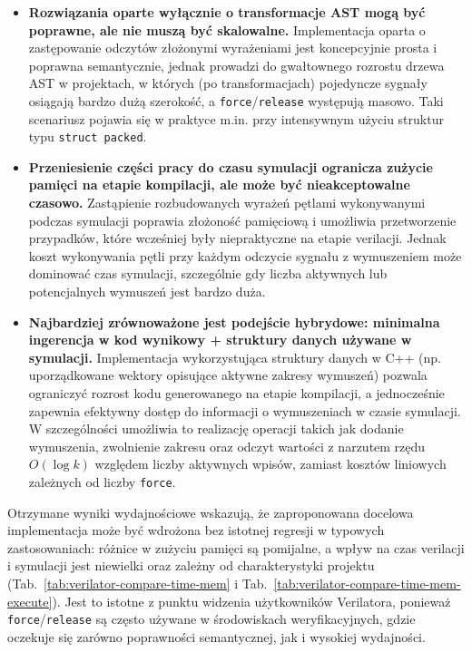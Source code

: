\documentclass[shortabstract, inz]{iithesis}
\newcounter{kod}[chapter]
\begin{document}
\begin{itemize}
    \item \textbf{Rozwiązania oparte wyłącznie o transformacje AST mogą być poprawne, ale nie muszą być skalowalne.}
    Implementacja oparta o zastępowanie odczytów złożonymi wyrażeniami jest koncepcyjnie prosta i poprawna semantycznie, jednak prowadzi do gwałtownego rozrostu drzewa AST w projektach, w których (po transformacjach) pojedyncze sygnały osiągają bardzo dużą szerokość, a \texttt{force}/\texttt{release} występują masowo. Taki scenariusz pojawia się w praktyce m.in. przy intensywnym użyciu struktur typu \texttt{struct packed}.
    
    \item \textbf{Przeniesienie części pracy do czasu symulacji ogranicza zużycie pamięci na etapie kompilacji, ale może być nieakceptowalne czasowo.}
    Zastąpienie rozbudowanych wyrażeń pętlami wykonywanymi podczas symulacji poprawia złożoność pamięciową i umożliwia przetworzenie przypadków, które wcześniej były niepraktyczne na etapie verilacji. Jednak koszt wykonywania pętli przy każdym odczycie sygnału z wymuszeniem może dominować czas symulacji, szczególnie gdy liczba aktywnych lub potencjalnych wymuszeń jest bardzo duża.
    
    \item \textbf{Najbardziej zrównoważone jest podejście hybrydowe: minimalna ingerencja w kod wynikowy + struktury danych używane w symulacji.}
    Implementacja wykorzystująca struktury danych w C++ (np. uporządkowane wektory opisujące aktywne zakresy wymuszeń) pozwala ograniczyć rozrost kodu generowanego na etapie kompilacji, a jednocześnie zapewnia efektywny dostęp do informacji o wymuszeniach w czasie symulacji. W szczególności umożliwia to realizację operacji takich jak dodanie wymuszenia, zwolnienie zakresu oraz odczyt wartości z narzutem rzędu $O(\log k)$ względem liczby aktywnych wpisów, zamiast kosztów liniowych zależnych od liczby \texttt{force}.
\end{itemize}

Otrzymane wyniki wydajnościowe wskazują, że zaproponowana docelowa implementacja może być wdrożona bez istotnej regresji w typowych zastosowaniach: różnice w zużyciu pamięci są pomijalne, a wpływ na czas verilacji i symulacji jest niewielki oraz zależny od charakterystyki projektu (Tab.~\ref{tab:verilator-compare-time-mem} i Tab.~\ref{tab:verilator-compare-time-mem-execute}). Jest to istotne z punktu widzenia użytkowników Verilatora, ponieważ \texttt{force}/\texttt{release} są często używane w środowiskach weryfikacyjnych, gdzie oczekuje się zarówno poprawności semantycznej, jak i wysokiej wydajności.
\end{document}
